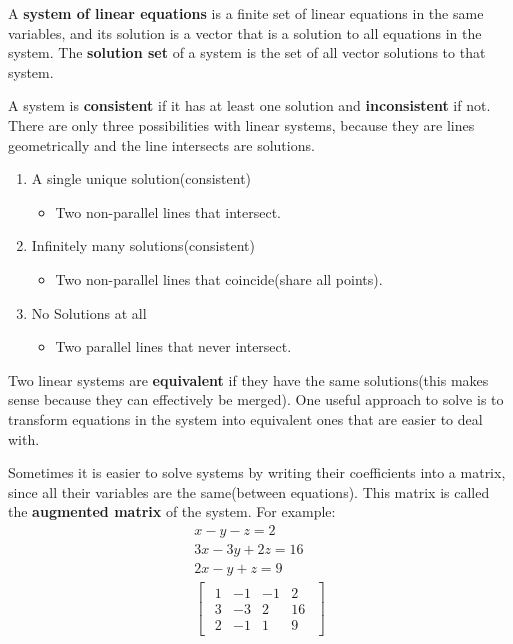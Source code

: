 \documentclass{article}
\begin{document}
A \textbf{system of linear equations} is a finite set of linear equations in the same variables, and its solution is a vector that is a solution to all equations in the system. The \textbf{solution set} of a system is the set of all vector solutions to that system.

A system is \textbf{consistent} if it has at least one solution and \textbf{inconsistent} if not. There are only three possibilities with linear systems, because they are lines geometrically and the line intersects are solutions.
\begin{enumerate}
    \item A single unique solution(consistent)
    \begin{itemize}
        \item Two non-parallel lines that intersect.
    \end{itemize}
    \item Infinitely many solutions(consistent)
    \begin{itemize}
        \item Two non-parallel lines that coincide(share all points).
    \end{itemize}
    \item No Solutions at all
    \begin{itemize}
        \item Two parallel lines that never intersect.
    \end{itemize}
\end{enumerate}
Two linear systems are \textbf{equivalent} if they have the same solutions(this makes sense because they can effectively be merged). One useful approach to solve is to transform equations in the system into equivalent ones that are easier to deal with.

Sometimes it is easier to solve systems by writing their coefficients into a matrix, since all their variables are the same(between equations). This matrix is called the \textbf{augmented matrix} of the system. For example:
\begin{gather*}
    x - y - z = 2\\
    3x - 3y + 2z = 16\\
    2x - y + z = 9\\
    \begin{bmatrix}
    \begin{array}{ccc|c}
    1 & -1 & -1 &2 \\
    3 & -3 & 2 & 16\\
    2 & -1 & 1 & 9
    \end{array}
    \end{bmatrix}
\end{gather*}
\end{document}
